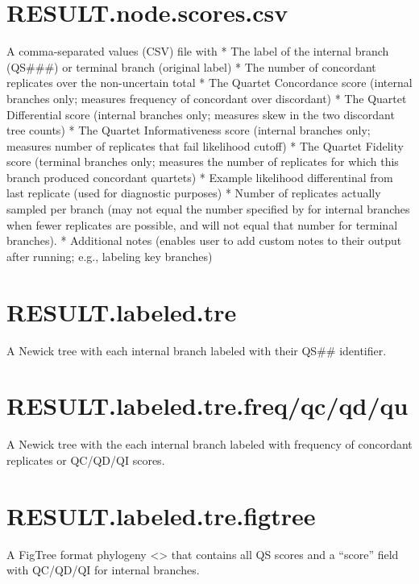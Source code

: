 \documentclass[letterpaper,12pt,english]{sphinxmanual}
\begin{document}
\section{RESULT.node.scores.csv}
\label{\detokenize{output:result-node-scores-csv}}
A comma-separated values (CSV) file with
*  The label of the internal branch (QS\#\#\#) or terminal branch (original label)
*  The number of concordant replicates over the non-uncertain total
*  The Quartet Concordance score (internal branches only; measures frequency of concordant over discordant)
*  The Quartet Differential score (internal branches only; measures skew in the two discordant tree counts)
*  The Quartet Informativeness score (internal branches only; measures number of replicates that fail likelihood cutoff)
*  The Quartet Fidelity score (terminal branches only; measures the number of replicates for which this branch produced concordant quartets)
*  Example likelihood differentinal from last replicate (used for diagnostic purposes)
*  Number of replicates actually sampled per branch (may not equal the number specified by  for internal branches when fewer replicates are possible, and will not equal that number for terminal branches).
*  Additional notes (enables user to add custom notes to their output after running; e.g., labeling key branches)


\section{RESULT.labeled.tre}
\label{\detokenize{output:result-labeled-tre}}
A Newick tree with each internal branch labeled with their QS\#\# identifier.


\section{RESULT.labeled.tre.freq/qc/qd/qu}
\label{\detokenize{output:result-labeled-tre-freq-qc-qd-qu}}
A Newick tree with the each internal branch labeled with frequency of concordant replicates or QC/QD/QI scores.


\section{RESULT.labeled.tre.figtree}
\label{\detokenize{output:result-labeled-tre-figtree}}
A FigTree format phylogeny \textless{}\textgreater{} that contains all QS scores and a “score” field with QC/QD/QI for internal branches.
\end{document}
